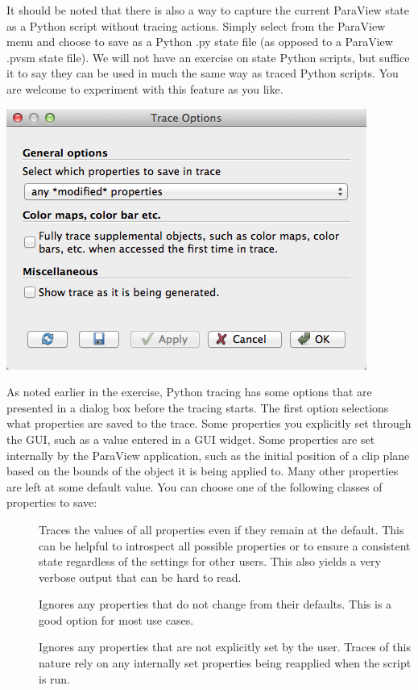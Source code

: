 It should be noted that there is also a way to capture the current ParaView
state as a Python script without tracing actions.  Simply select  from the ParaView  menu and choose to save as a
Python .py state file (as opposed to a ParaView .pvsm state file).  We will
not have an exercise on state Python scripts, but suffice it to say they
can be used in much the same way as traced Python scripts.  You are welcome
to experiment with this feature as you like.

\begin{inlinefig}
  \includegraphics[width=0.8\scw]{images/TraceOptions}
\end{inlinefig}

As noted earlier in the exercise, Python tracing has some options that are
presented in a dialog box before the tracing starts. The first option
selections what properties are saved to the trace. Some properties you
explicitly set through the GUI, such as a value entered in a GUI
widget. Some properties are set internally by the ParaView application,
such as the initial position of a clip plane based on the bounds of the
object it is being applied to. Many other properties are left at some
default value. You can choose one of the following classes of properties to
save:
\begin{description}
\item[] Traces the values of all properties even if
  they remain at the default. This can be helpful to introspect all
  possible properties or to ensure a consistent state regardless of the
  settings for other users. This also yields a very verbose output that can
  be hard to read.
\item[] Ignores any properties that do not
  change from their defaults. This is a good option for most use cases.
\item[] Ignores any properties that
  are not explicitly set by the user. Traces of this nature rely on any
  internally set properties being reapplied when the script is run.
\end{description}

